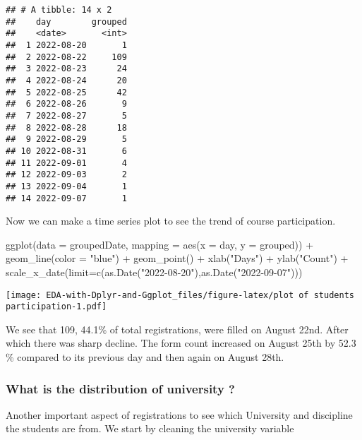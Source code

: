 \documentclass[
]{article}
\newenvironment{Shaded}{\begin{snugshade}}{\end{snugshade}}
\newcommand{\AttributeTok}[1]{\textcolor[rgb]{0.77,0.63,0.00}{#1}}
\newcommand{\FunctionTok}[1]{\textcolor[rgb]{0.00,0.00,0.00}{#1}}
\newcommand{\NormalTok}[1]{#1}
\newcommand{\SpecialCharTok}[1]{\textcolor[rgb]{0.00,0.00,0.00}{#1}}
\newcommand{\StringTok}[1]{\textcolor[rgb]{0.31,0.60,0.02}{#1}}
\begin{document}
\begin{verbatim}
## # A tibble: 14 x 2
##    day        grouped
##    <date>       <int>
##  1 2022-08-20       1
##  2 2022-08-22     109
##  3 2022-08-23      24
##  4 2022-08-24      20
##  5 2022-08-25      42
##  6 2022-08-26       9
##  7 2022-08-27       5
##  8 2022-08-28      18
##  9 2022-08-29       5
## 10 2022-08-31       6
## 11 2022-09-01       4
## 12 2022-09-03       2
## 13 2022-09-04       1
## 14 2022-09-07       1
\end{verbatim}

Now we can make a time series plot to see the trend of course
participation.

\begin{Shaded}
\begin{Highlighting}[]
\FunctionTok{ggplot}\NormalTok{(}\AttributeTok{data =}\NormalTok{ groupedDate, }\AttributeTok{mapping =} \FunctionTok{aes}\NormalTok{(}\AttributeTok{x =}\NormalTok{ day, }\AttributeTok{y =}\NormalTok{ grouped)) }\SpecialCharTok{+}
  \FunctionTok{geom\_line}\NormalTok{(}\AttributeTok{color =} \StringTok{"blue"}\NormalTok{) }\SpecialCharTok{+}
  \FunctionTok{geom\_point}\NormalTok{() }\SpecialCharTok{+}
  \FunctionTok{xlab}\NormalTok{(}\StringTok{"Days"}\NormalTok{) }\SpecialCharTok{+}
  \FunctionTok{ylab}\NormalTok{(}\StringTok{"Count"}\NormalTok{) }\SpecialCharTok{+}
  \FunctionTok{scale\_x\_date}\NormalTok{(}\AttributeTok{limit=}\FunctionTok{c}\NormalTok{(}\FunctionTok{as.Date}\NormalTok{(}\StringTok{"2022{-}08{-}20"}\NormalTok{),}\FunctionTok{as.Date}\NormalTok{(}\StringTok{"2022{-}09{-}07"}\NormalTok{)))}
\end{Highlighting}
\end{Shaded}

\texttt{[image: EDA-with-Dplyr-and-Ggplot\_files/figure-latex/plot of students participation-1.pdf]}

We see that 109, 44.1\% of total registrations, were filled on August
22nd. After which there was sharp decline. The form count increased on
August 25th by 52.3 \% compared to its previous day and then again on
August 28th.

\hypertarget{what-is-the-distribution-of-university}{%
\subsubsection{What is the distribution of university
?}\label{what-is-the-distribution-of-university}}

Another important aspect of registrations to see which University and
discipline the students are from. We start by cleaning the university
variable
\end{document}
